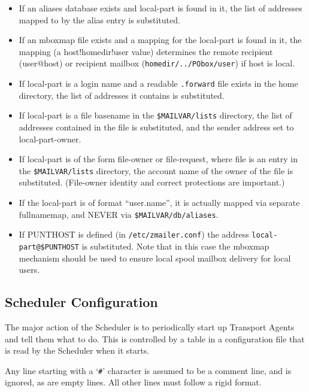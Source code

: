 \begin{itemize}
\item If an aliases database exists and local-part is found in it, the list of
addresses mapped to by the alias entry is substituted.
\item If an mboxmap file exists and a mapping for the local-part is found in it,
the mapping (a host!homedir!user value) determines the remote recipient
(user@host) or recipient mailbox ({\tt homedir/../PObox/user}) if host 
is local.
\item If local-part is a login name and a readable {\tt .forward} file 
exists in the home directory, the list of addresses it contains is substituted.
\item If local-part is a file basename in the {\tt \$MAILVAR/lists} 
directory, the   list of addresses contained in the file is substituted, and 
the sender address set to local-part-owner.
\item If local-part is of the form file-owner or file-request, where file is
an entry in the {\tt \$MAILVAR/lists} directory, the account name 
of the owner of the file is substituted.   (File-owner identity and correct 
protections are important.)
\item If the local-part is of format  ``user.name'',  it is actually mapped via
separate   fullnamemap, and NEVER via {\tt \$MAILVAR/db/aliases}.
\item If PUNTHOST is defined (in {\tt /etc/zmailer.conf}) the address
{\tt local-part@\$PUNTHOST} is substituted.  Note that in this case
the mboxmap mechanism should be used to ensure local spool
mailbox delivery for local users.
\end{itemize}





\subsection{Scheduler Configuration}





The major action of the Scheduler is to periodically start up Transport
Agents and tell them what to do.  This is controlled by a table in a
configuration file that is read by the Scheduler when it starts.  

Any line starting with a `{\tt \#}' character is assumed to be a comment 
line, and is ignored, as are empty lines.  All other lines must follow a rigid
format. 

